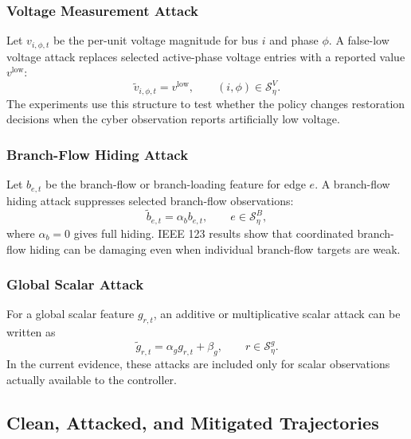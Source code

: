 \subsubsection{Voltage Measurement Attack}

Let $v_{i,\phi,t}$ be the per-unit voltage magnitude for bus $i$ and phase $\phi$. A false-low voltage attack replaces selected active-phase voltage entries with a reported value $v^{\mathrm{low}}$:
\begin{equation}
    \tilde{v}_{i,\phi,t}
    =
    v^{\mathrm{low}},
    \qquad
    (i,\phi) \in \mathcal{S}_{\eta}^{V}.
    \label{eq:voltage_attack}
\end{equation}
The experiments use this structure to test whether the policy changes restoration decisions when the cyber observation reports artificially low voltage.

\subsubsection{Branch-Flow Hiding Attack}

Let $b_{e,t}$ be the branch-flow or branch-loading feature for edge $e$. A branch-flow hiding attack suppresses selected branch-flow observations:
\begin{equation}
    \tilde{b}_{e,t}
    =
    \alpha_b b_{e,t},
    \qquad
    e \in \mathcal{S}_{\eta}^{B},
    \label{eq:branchflow_attack}
\end{equation}
where $\alpha_b = 0$ gives full hiding. IEEE 123 results show that coordinated branch-flow hiding can be damaging even when individual branch-flow targets are weak.

\subsubsection{Global Scalar Attack}

For a global scalar feature $g_{r,t}$, an additive or multiplicative scalar attack can be written as
\begin{equation}
    \tilde{g}_{r,t}
    =
    \alpha_g g_{r,t} + \beta_g,
    \qquad
    r \in \mathcal{S}_{\eta}^{g}.
    \label{eq:global_scalar_attack}
\end{equation}
In the current evidence, these attacks are included only for scalar observations actually available to the controller.

\subsection{Clean, Attacked, and Mitigated Trajectories}
\label{subsec:trajectories}

